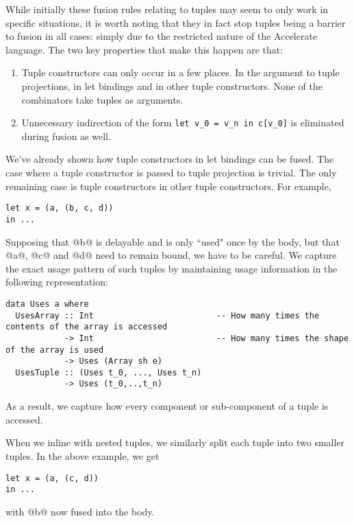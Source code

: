 
While initially these fusion rules relating to tuples may seem to only work in specific situations, it is worth noting that they in fact stop tuples being a barrier to fusion in all cases: simply due to the restricted nature of the Accelerate language. The two key properties that make this happen are that:
\begin{enumerate}
\item Tuple constructors can only occur in a few places. In the argument to tuple projections, in let bindings and in other tuple constructors. None of the combinators take tuples as arguments.
\item Unnecessary indirection of the form \lstinline[style=ndp]{let v_0 = v_n in c[v_0]} is eliminated during fusion as well.
\end{enumerate}
We've already shown how tuple constructors in let bindings can be fused. The case where a tuple constructor is passed to tuple projection is trivial. The only remaining case is tuple constructors in other tuple constructors. For example,
%
\begin{lstlisting}
let x = (a, (b, c, d))
in ...
\end{lstlisting}
%
Supposing that @b@ is delayable and is only ``used" once by the body, but that @a@, @c@ and @d@ need to remain bound, we have to be careful. We capture the exact usage pattern of such tuples by maintaining usage information in the following representation:
%
\begin{lstlisting}
data Uses a where
  UsesArray :: Int                         -- How many times the contents of the array is accessed
            -> Int                         -- How many times the shape of the array is used
            -> Uses (Array sh e)
  UsesTuple :: (Uses t_0, ..., Uses t_n)
            -> Uses (t_0,..,t_n)
\end{lstlisting}
%
As a result, we capture how every component or sub-component of a tuple is accessed.

When we inline with nested tuples, we similarly split each tuple into two smaller tuples. In the above example, we get
%
\begin{lstlisting}
let x = (a, (c, d))
in ...
\end{lstlisting}
%
with @b@ now fused into the body.


